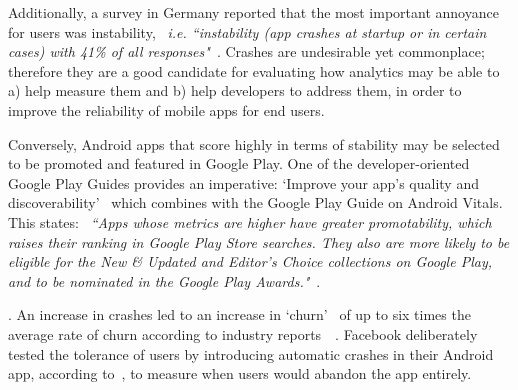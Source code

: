 Additionally, a survey in Germany reported that the most important annoyance for users was instability, ~\emph{i.e. ``instability (app crashes at startup or in certain cases) with 41\% of all responses"}~.  %
%
Crashes are undesirable yet commonplace; therefore they are a good candidate for evaluating how analytics may be able to a) help measure them and b) help developers to address them, in order to improve the reliability of mobile apps for end users.

Conversely, Android apps that score highly in terms of stability may be selected to be promoted and featured in Google Play. One of the developer-oriented Google Play Guides provides an imperative: `Improve your app’s quality and discoverability'~ which combines with the Google Play Guide on Android Vitals. This states: ~\emph{``Apps whose metrics are higher have greater promotability, which raises their ranking in Google Play Store searches. They also are more likely to be eligible for the New \& Updated and Editor's Choice collections on Google Play, and to be nominated in the Google Play Awards."}~. %

. An increase in crashes led to an increase in `churn'~ of up to six times the average rate of churn according to industry reports~~. 
Facebook deliberately tested the tolerance of users by introducing automatic crashes in their Android app, according to~, to measure when users would abandon the app entirely. %


